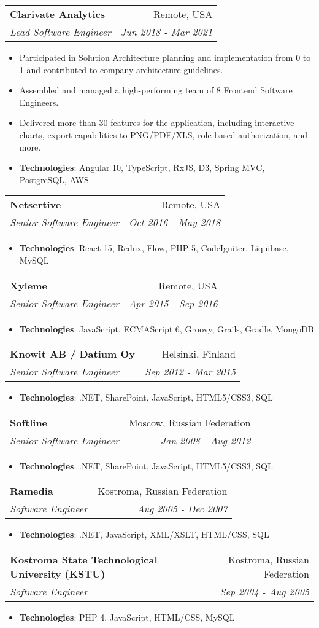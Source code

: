 \documentclass[a4paper,11pt]{article}
\makeatletter
\newcommand{\resumeItem}[2]{
  \item\small{
    \textbf{#1}{: #2 \vspace{-2pt}}
  }
}
\newcommand{\resumeItemNoIntro}[1]{
  \item\small{
    {#1 \vspace{-2pt}}
  }
}
\newcommand{\resumeSubheading}[4]{
  \vspace{-1pt}\item
    \begin{tabular*}{0.97\textwidth}[t]{l@{\extracolsep{\fill}}r}
      \textbf{#1} & #2 \\
      \textit{\small#3} & \textit{\small #4} \\
    \end{tabular*}\vspace{-5pt}
}
\newcommand{\resumeItemListStart}{\begin{itemize}}
\newcommand{\resumeItemListEnd}{\end{itemize}\vspace{-5pt}}
\makeatother
\begin{document}
    \resumeSubheading
      {Clarivate Analytics}{Remote, USA}
      {Lead Software Engineer}{Jun 2018 - Mar 2021}
      \resumeItemListStart
        \resumeItemNoIntro
          {Participated in Solution Architecture planning and implementation from 0 to 1 and contributed to company architecture guidelines.}
        \resumeItemNoIntro
          {Assembled and managed a high-performing team of 8 Frontend Software Engineers.}
        \resumeItemNoIntro
          {Delivered more than 30 features for the application, including interactive charts, export capabilities to PNG/PDF/XLS, role-based authorization, and more.}
        \resumeItem{Technologies}
          {Angular 10, TypeScript, RxJS, D3, Spring MVC, PostgreSQL, AWS}
      \resumeItemListEnd          

    \resumeSubheading
      {Netsertive}{Remote, USA}
      {Senior Software Engineer}{Oct 2016 - May 2018}
      \resumeItemListStart
        \resumeItem{Technologies}
          {React 15, Redux, Flow, PHP 5, CodeIgniter, Liquibase, MySQL}
      \resumeItemListEnd   

    \resumeSubheading
      {Xyleme}{Remote, USA}
      {Senior Software Engineer}{Apr 2015 - Sep 2016}
      \resumeItemListStart
        \resumeItem{Technologies}
          {JavaScript, ECMAScript 6, Groovy, Grails, Gradle, MongoDB}
      \resumeItemListEnd   

    \resumeSubheading
      {Knowit AB / Datium Oy}{Helsinki, Finland}
      {Senior Software Engineer}{Sep 2012 - Mar 2015}
      \resumeItemListStart
        \resumeItem{Technologies}
          {.NET, SharePoint, JavaScript, HTML5/CSS3, SQL}
      \resumeItemListEnd   

    \resumeSubheading
      {Softline}{Moscow, Russian Federation}
      {Senior Software Engineer}{Jan 2008 - Aug 2012}
      \resumeItemListStart
        \resumeItem{Technologies}
          {.NET, SharePoint, JavaScript, HTML5/CSS3, SQL}
      \resumeItemListEnd         

    \resumeSubheading
      {Ramedia}{Kostroma, Russian Federation}
      {Software Engineer}{Aug 2005 - Dec 2007}
      \resumeItemListStart
        \resumeItem{Technologies}
          {.NET, JavaScript, XML/XSLT, HTML/CSS, SQL}
      \resumeItemListEnd    

    \resumeSubheading
      {Kostroma State Technological University (KSTU)}{Kostroma, Russian Federation}
      {Software Engineer}{Sep 2004 - Aug 2005}
      \resumeItemListStart
        \resumeItem{Technologies}
          {PHP 4, JavaScript, HTML/CSS, MySQL}
      \resumeItemListEnd        
      
\end{document}
